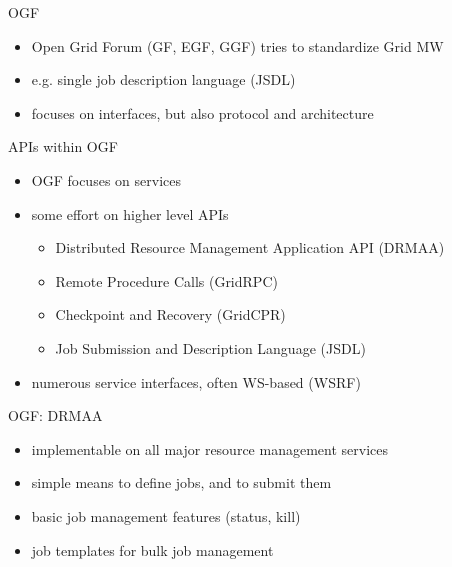 \documentclass[%
  pdf,
  colorBG,
  slideColor,
  frames,
  ogf
]{prosper}
\newcommand{\dn}{\vspace*{+1em}}
\begin{document}

 \begin{slide}{OGF}
 \dn
  \begin{itemize}
   \item Open Grid Forum (GF, EGF, GGF) tries to standardize Grid MW
   \item e.g. single job description language (JSDL)
   \item focuses on interfaces, but also protocol and architecture
  \end{itemize}
 \end{slide}


 \begin{slide}{APIs within OGF}

 \dn 

  \begin{itemize}
   \item OGF focuses on services
   \item some effort on higher level APIs
   \begin{itemize}
    \item Distributed Resource Management Application API (DRMAA)
    \item Remote Procedure Calls (GridRPC)
    \item Checkpoint and Recovery (GridCPR)
    \item Job Submission and Description Language (JSDL)
   \end{itemize}
   \item numerous service interfaces, often WS-based (WSRF)
  \end{itemize}

 \end{slide}


 \begin{slide}{OGF: DRMAA}

 \dn 

  \begin{itemize}
   \item implementable on all major resource management services
   \item simple means to define jobs, and to submit them
   \item basic job management features (status, kill)
   \item job templates for bulk job management
  \end{itemize}

 \end{slide}
\end{document}
